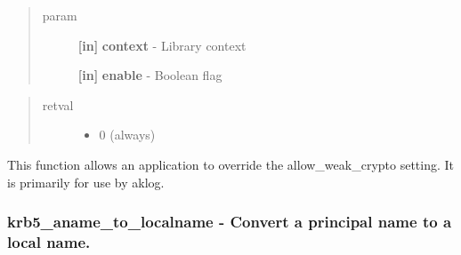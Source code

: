 \documentclass[letterpaper,10pt,english]{sphinxmanual}
\begin{document}
\begin{quote}\begin{description}
\item[{param}] \leavevmode
\textbf{{[}in{]}} \textbf{context} - Library context

\textbf{{[}in{]}} \textbf{enable} - Boolean flag

\end{description}\end{quote}
\begin{quote}\begin{description}
\item[{retval}] \leavevmode\begin{itemize}
\item {} 
0   (always)

\end{itemize}

\end{description}\end{quote}

This function allows an application to override the allow\_weak\_crypto setting. It is primarily for use by aklog.


\subsubsection{krb5\_aname\_to\_localname -  Convert a principal name to a local name.}
\label{appdev/refs/api/krb5_aname_to_localname::doc}\label{appdev/refs/api/krb5_aname_to_localname:krb5-aname-to-localname-convert-a-principal-name-to-a-local-name}

\begin{fulllineitems}
\label{appdev/refs/api/krb5_aname_to_localname:krb5_aname_to_localname}
\end{fulllineitems}
\end{document}
